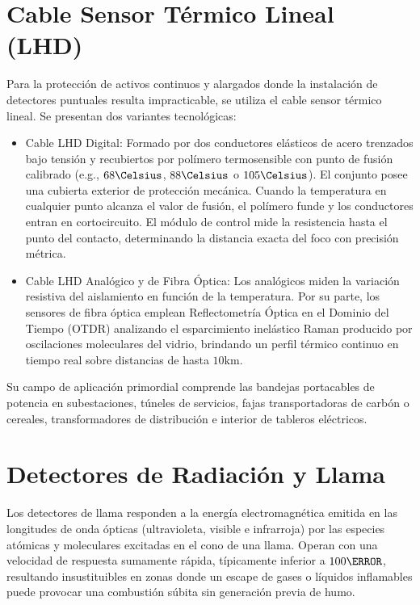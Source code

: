 \section{Cable Sensor Térmico Lineal (LHD)}

Para la protección de activos continuos y alargados donde la instalación de detectores puntuales resulta impracticable, se
utiliza el cable sensor térmico lineal. Se presentan dos variantes tecnológicas:

\begin{itemize}
    \item Cable LHD Digital: Formado por dos conductores elásticos de acero trenzados bajo tensión y
          recubiertos por polímero termosensible con punto de fusión calibrado (e.g., $68\Celsius$,
          $88\Celsius$ o $105\Celsius$). El conjunto posee una cubierta exterior de protección mecánica.
          Cuando la temperatura en cualquier punto alcanza el valor de fusión, el polímero funde y los
          conductores entran en cortocircuito. El módulo de control mide la resistencia hasta el punto
          del contacto, determinando la distancia exacta del foco con precisión métrica.
    \item Cable LHD Analógico y de Fibra Óptica: Los analógicos miden la variación resistiva del aislamiento en función
          de la temperatura. Por su parte, los sensores de fibra óptica emplean Reflectometría Óptica
          en el Dominio del Tiempo (OTDR) analizando el esparcimiento inelástico Raman producido por oscilaciones
          moleculares del vidrio, brindando un perfil térmico continuo en tiempo real sobre distancias de hasta
          $10\unit{\kilo\meter}$.
\end{itemize}
Su campo de aplicación primordial comprende las bandejas portacables de potencia en subestaciones, túneles de servicios,
fajas transportadoras de carbón o cereales, transformadores de distribución e interior de tableros eléctricos.

\section{Detectores de Radiación y Llama}

Los detectores de llama responden a la energía electromagnética emitida en las longitudes de onda ópticas (ultravioleta,
visible e infrarroja) por las especies atómicas y moleculares excitadas en el cono de una llama. Operan con una velocidad de
respuesta sumamente rápida, típicamente inferior a $100\ms$, resultando insustituibles en zonas donde un escape de gases o
líquidos inflamables puede provocar una combustión súbita sin generación previa de humo.

